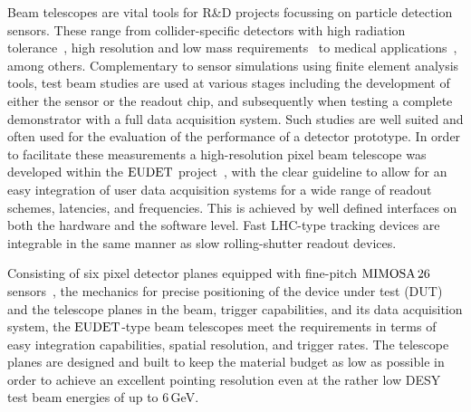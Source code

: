 
Beam telescopes are vital tools for R\&D projects focussing on particle detection sensors. 
These range from collider-specific detectors with high radiation tolerance~\cite{1748-0221-9-12-C12001,1748-0221-9-12-C12029},
 high resolution and low mass requirements~\cite{1748-0221-10-03-C03044} to medical applications~\cite{Ballabriga2011S15}, among others. 
Complementary to sensor simulations using finite element analysis tools, test beam studies are used at various stages including the development of either the sensor or the readout chip,
 and subsequently when testing a complete demonstrator with a full data acquisition system. 
Such studies are well suited and often used for the evaluation of the performance of a detector prototype. %
In order to facilitate these measurements a high-resolution pixel beam telescope was developed within the $\textrm{EUDET}$ project~\cite{ref:eudetreport200902},
 with the clear guideline to allow for an easy integration of user data acquisition systems for a wide range of readout schemes, latencies, and frequencies. 
This is achieved by well defined interfaces on both the hardware and the software level. 
Fast LHC-type tracking devices are integrable in the same manner as slow rolling-shutter readout devices. 

Consisting of six pixel detector planes equipped with fine-pitch $\textrm{MIMOSA\,26}$ sensors~\cite{HuGuo2010480},
 the mechanics for precise positioning of the device under test (DUT) and the telescope planes in the beam, trigger capabilities, and its data acquisition system, 
 the $\textrm{EUDET}$-type beam telescopes meet the requirements in terms of easy integration capabilities, spatial resolution, and trigger rates. 
The telescope planes are designed and built to keep the material budget as low as possible in order to achieve an excellent pointing resolution
 even at the rather low DESY test beam energies of up to 6\,GeV.

